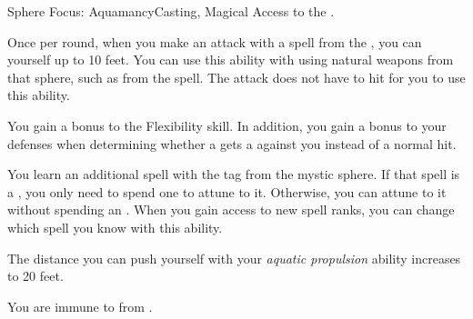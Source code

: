     \begin{feat}{Sphere Focus: Aquamancy}{Casting, Magical}
        \featpre Access to the  .

         Once per round, when you make an attack with a spell from the  , you can  yourself up to 10 feet.
        You can use this ability with  using natural weapons from that sphere, such as from the  spell.
        The attack does not have to hit for you to use this ability.

         You gain a  bonus to the Flexibility skill.
        In addition, you gain a  bonus to your defenses when determining whether a  gets a  against you instead of a normal hit.

         You learn an additional spell with the  tag from the  mystic sphere.
        If that spell is a , you only need to spend one  to attune to it.
        Otherwise, you can attune to it without spending an .
        When you gain access to new spell ranks, you can change which spell you know with this ability.

         The distance you can push yourself with your \textit{aquatic propulsion} ability increases to 20 feet.

         You are immune to  from .
    \end{feat}

